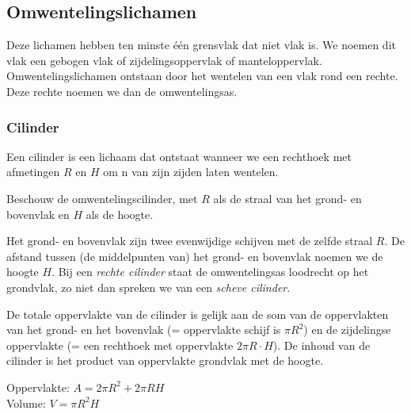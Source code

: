 \subsection{Omwentelingslichamen}

Deze lichamen hebben ten minste \'e\'en grensvlak dat niet vlak is. We noemen dit vlak een gebogen vlak of zijdelingsoppervlak of manteloppervlak. Omwentelingslichamen ontstaan door het wentelen van een vlak rond een rechte. Deze rechte noemen we dan de omwentelingsas.

\subsubsection{Cilinder}
\begin{definitie}
	Een cilinder is een lichaam dat ontstaat wanneer we een rechthoek met afmetingen  $R$ en $H$ om n van zijn zijden laten wentelen.
\end{definitie}
 Beschouw de omwentelingscilinder, met $R$ als de straal van het grond- en bovenvlak en $H$ als de hoogte.

Het grond- en bovenvlak zijn twee evenwijdige schijven met de zelfde straal $R$. De afstand tussen (de middelpunten van) het grond- en bovenvlak noemen we de hoogte $H$. Bij een \emph{rechte cilinder} staat de omwentelingsas loodrecht op het grondvlak, zo niet dan spreken we van een \emph{scheve cilinder}.

De totale oppervlakte van de cilinder is gelijk aan de som van de oppervlakten van het grond- en het bovenvlak (= oppervlakte schijf is $\pi R^2$) en de zijdelingse oppervlakte (= een rechthoek met oppervlakte $2\pi R\cdot H$). De inhoud van de cilinder is het product van oppervlakte grondvlak met de hoogte.



\begin{ftonthoud}
	
		Oppervlakte: $A=2\pi R^2 + 2\pi RH$
		\\
		Volume: $V=\pi R^2 H$
\end{ftonthoud}

